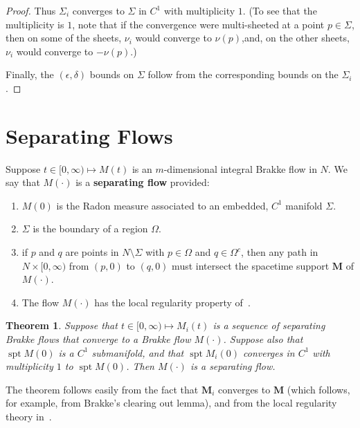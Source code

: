 \documentclass{amsart}
\newcommand{\MMM}{\mathbf M}
\newcommand{\eps}{\epsilon}
\newcommand{\spt}{\operatorname{spt}}
\newtheorem{theorem}    {Theorem}   %
\theoremstyle{definition}
\theoremstyle{definition}
\begin{document}
\begin{proof}
Thus $\Sigma_i$ converges to $\Sigma$ in $C^1$ with multiplicity $1$.
(To see that the multiplicity is $1$, 
 note that if the convergence were multi-sheeted at a point $p\in \Sigma$,
then on some of the sheets, $\nu_i$ would converge to $\nu(p)$,and, on the other
sheets, $\nu_i$ would converge to $-\nu(p)$.)

Finally, the $(\eps, \delta)$ bounds on $\Sigma$ follow from the corresponding
bounds on the $\Sigma_i$.
\end{proof}










  






\section{Separating Flows}\label{separating-section}


Suppose $t\in [0,\infty)\mapsto M(t)$ is an $m$-dimensional integral Brakke flow in $N$.
We say that $M(\cdot)$ is a {\bf separating flow} provided:
\begin{enumerate}
\item $M(0)$ is the Radon measure associated to an embedded, $C^1$ manifold $\Sigma$.
\item $\Sigma$ is the boundary of a region $\Omega$.
\item if $p$ and $q$ are points in $N\setminus \Sigma$ with $p\in \Omega$ and $q\in \Omega^c$,
then any path in $N\times[0,\infty)$ from $(p,0)$ to $(q,0)$ must intersect the spacetime
support $\MMM$ of $M(\cdot)$.
\item The flow $M(\cdot)$ has the local regularity property of~\cite{white-local}.
\end{enumerate}



\begin{theorem}\label{separating-limits}
Suppose that $t\in [0,\infty)\mapsto M_i(t)$ is a sequence of  separating Brakke flows
that converge to a Brakke flow $M(\cdot)$.  
Suppose also that $\spt M(0)$ is a $C^1$ submanifold, and that $\spt M_i(0)$
converges in $C^1$ with multiplicity $1$ to $\spt M(0)$.
Then $M(\cdot)$ is a separating flow.
\end{theorem}

The theorem follows easily from the fact that $\MMM_i$ converges to $\MMM$ (which follows,
for example, from Brakke's clearing out lemma), and from the local regularity theory
  in~\cite{white-local}.
\end{document}
